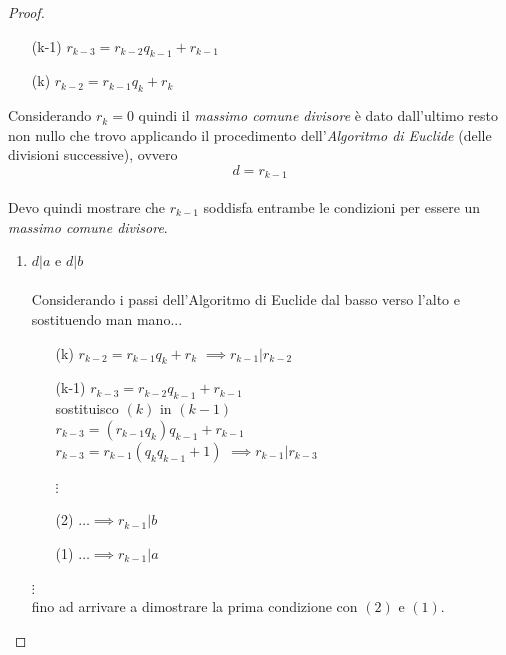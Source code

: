 \documentclass[a4paper,12pt, oneside]{book}
\begin{document}
\begin{proof}
\begin{itemize}
\begin{enumerate}[label=(\arabic*)]
			      \item [(k-1)] $r_{k-3} = r_{k-2}q_{k-1} + r_{k-1}$
			      \item [(k)] $r_{k-2} = r_{k-1}q_k + r_k$
		      \end{enumerate}
		      Considerando $r_k = 0$ quindi il \textit{massimo comune divisore} è dato dall'ultimo resto non nullo che trovo applicando il procedimento dell'\textit{Algoritmo di Euclide} (delle divisioni successive), ovvero $$d=r_{k-1}$$\\
		      Devo quindi mostrare che $r_{k-1}$ soddisfa entrambe le condizioni per essere un \textit{massimo comune divisore}.
		      \begin{enumerate}
			      \item $d|a$ e $d|b$\\\\
			            Considerando i passi dell'Algoritmo di Euclide dal basso verso l'alto e sostituendo man mano...
			            \begin{enumerate}
				            \item [(k)] $r_{k-2} = r_{k-1}q_k + r_k$
				                  $\implies r_{k-1} | r_{k-2}$
				            \item [(k-1)] $r_{k-3} = r_{k-2}q_{k-1} + r_{k-1}$\\
				                  sostituisco $(k)$ in $(k-1)$\\
				                  $r_{k-3} = (r_{k-1}q_k)q_{k-1} + r_{k-1}$\\
				                  $r_{k-3} = r_{k-1}(q_kq_{k-1}+1)$
				                  $\implies r_{k-1} | r_{k-3}$

				                  $\vdots$

				            \item [(2)] $\dots \implies r_{k-1} | b$
				            \item [(1)] $\dots \implies r_{k-1} | a$
			            \end{enumerate}
			            $\vdots$\\
			            fino ad arrivare a dimostrare la prima condizione con $(2)$ e $(1)$.\\


\end{enumerate}
\end{itemize}
\end{proof}
\end{document}

